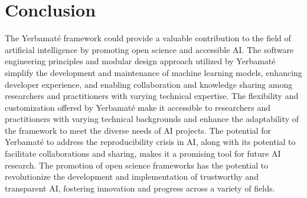 \section{Conclusion}





The Yerbamaté framework could provide a valuable contribution to the field of artificial intelligence by promoting open science and accessible AI. The software engineering principles and modular design approach utilized by Yerbamaté simplify the development and maintenance of machine learning models, enhancing developer experience, and enabling collaboration and knowledge sharing among researchers and practitioners with varying technical expertise. The flexibility and customization offered by Yerbamaté make it accessible to researchers and practitioners with varying technical backgrounds and enhance the adaptability of the framework to meet the diverse needs of AI projects. The potential for Yerbamaté to address the reproducibility crisis in AI, along with its potential to facilitate collaborations and sharing, makes it a promising tool for future AI research. The promotion of open science frameworks has the potential to revolutionize the development and implementation of trustworthy and transparent AI, fostering innovation and progress across a variety of fields. 

